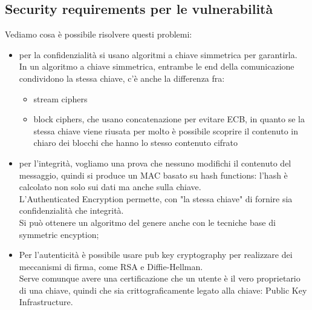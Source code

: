 \documentclass[12pt, oneside]{extbook} %
\begin{document}
\subsection{Security requirements per le vulnerabilità}
Vediamo cosa è possibile risolvere questi problemi:
\begin{itemize}
    \item per la confidenzialità si usano algoritmi a chiave simmetrica per garantirla.
\\In un algoritmo a chiave simmetrica, entrambe le end della comunicazione condividono la stessa chiave, c'è anche la differenza fra:
\begin{itemize}
\item stream ciphers 
\item block ciphers, che usano concatenazione per evitare ECB, in quanto se la stessa chiave viene riusata per molto è possibile scoprire il contenuto in chiaro dei blocchi che hanno lo stesso contenuto cifrato
\end{itemize}
    \item per l'integrità, vogliamo una prova che nessuno modifichi il contenuto del messaggio, quindi si produce un MAC basato su hash functions: l'hash è calcolato non solo sui dati ma anche sulla chiave.
    \\L'Authenticated Encryption permette, con "la stessa chiave" di fornire sia confidenzialità che integrità.
    \\Si può ottenere un algoritmo del genere anche con le tecniche base di symmetric encyption;
    \item Per l'autenticità è possibile usare pub key cryptography per realizzare dei meccanismi di firma, come RSA e Diffie-Hellman.
    \\Serve comunque avere una certificazione che un utente è il vero proprietario di una chiave, quindi che sia crittograficamente legato alla chiave: Public Key Infrastructure.
\end{itemize}
\end{document}

